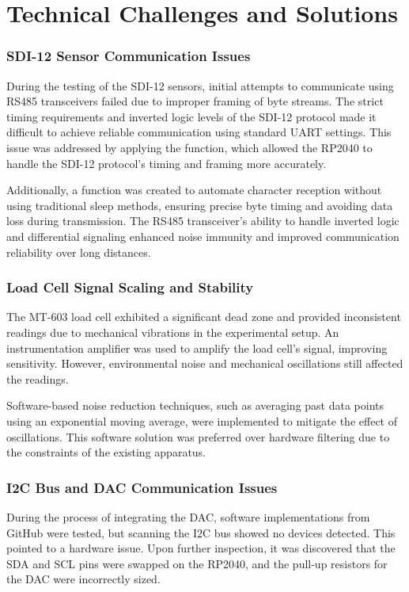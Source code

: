 \section{Technical Challenges and Solutions}

\subsubsection{SDI-12 Sensor Communication Issues}
During the testing of the SDI-12 sensors, initial attempts to communicate using RS485 transceivers failed due to improper framing of byte streams. The strict timing requirements and inverted logic levels of the SDI-12 protocol made it difficult to achieve reliable communication using standard UART settings. This issue was addressed by applying the  function, which allowed the RP2040 to handle the SDI-12 protocol's timing and framing more accurately.

Additionally, a  function was created to automate character reception without using traditional sleep methods, ensuring precise byte timing and avoiding data loss during transmission. The RS485 transceiver's ability to handle inverted logic and differential signaling enhanced noise immunity and improved communication reliability over long distances.

\subsubsection{Load Cell Signal Scaling and Stability}
The MT-603 load cell exhibited a significant dead zone and provided inconsistent readings due to mechanical vibrations in the experimental setup. An instrumentation amplifier was used to amplify the load cell's signal, improving sensitivity. However, environmental noise and mechanical oscillations still affected the readings.

Software-based noise reduction techniques, such as averaging past data points using an exponential moving average, were implemented to mitigate the effect of oscillations. This software solution was preferred over hardware filtering due to the constraints of the existing apparatus.

\subsubsection{I2C Bus and DAC Communication Issues}
During the process of integrating the DAC, software implementations from GitHub were tested, but scanning the I2C bus showed no devices detected. This pointed to a hardware issue. Upon further inspection, it was discovered that the SDA and SCL pins were swapped on the RP2040, and the pull-up resistors for the DAC were incorrectly sized.


